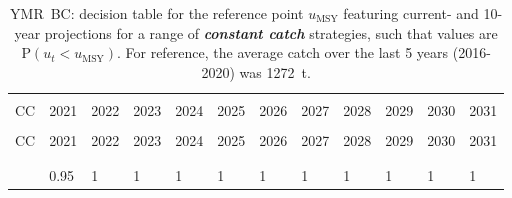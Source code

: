\documentclass[11pt]{book}
\newcommand{\umsy}{u_\text{MSY}}
\newcommand{\itbf}[1]{\textit{\textbf{#1}}}
\begin{document}
\begin{longtable}[c]{>{\raggedright\let\newline\\\arraybackslash\hspace{0pt}}p{0.5in}>{\raggedleft\let\newline\\\arraybackslash\hspace{0pt}}p{0.5in}>{\raggedleft\let\newline\\\arraybackslash\hspace{0pt}}p{0.53in}>{\raggedleft\let\newline\\\arraybackslash\hspace{0pt}}p{0.53in}>{\raggedleft\let\newline\\\arraybackslash\hspace{0pt}}p{0.53in}>{\raggedleft\let\newline\\\arraybackslash\hspace{0pt}}p{0.53in}>{\raggedleft\let\newline\\\arraybackslash\hspace{0pt}}p{0.53in}>{\raggedleft\let\newline\\\arraybackslash\hspace{0pt}}p{0.53in}>{\raggedleft\let\newline\\\arraybackslash\hspace{0pt}}p{0.53in}>{\raggedleft\let\newline\\\arraybackslash\hspace{0pt}}p{0.53in}>{\raggedleft\let\newline\\\arraybackslash\hspace{0pt}}p{0.5in}>{\raggedleft\let\newline\\\arraybackslash\hspace{0pt}}p{0.5in}}
  \caption{YMR~BC: decision table for the reference point $\umsy$ featuring current- and 10-year projections for a range of \itbf{constant catch} strategies, such that values are P$(u_t < \umsy)$.  For reference, the average catch over the last 5 years (2016-2020) was 1272~t. } \label{tab:ymr.gmu.umsy.CCs}\\  \hline\\[-2.2ex]  CC  & 2021 & 2022 & 2023 & 2024 & 2025 & 2026 & 2027 & 2028 & 2029 & 2030 & 2031 \\[0.2ex]\hline\\[-1.5ex]  \endfirsthead   \hline  CC  & 2021 & 2022 & 2023 & 2024 & 2025 & 2026 & 2027 & 2028 & 2029 & 2030 & 2031 \\[0.2ex]\hline\\[-1.5ex]  \endhead  \hline\\[-2.2ex]   \endfoot  \hline \endlastfoot  0 & 0.95 & 1 & 1 & 1 & 1 & 1 & 1 & 1 & 1 & 1 & 1 \\ 

\end{longtable}
\end{document}
